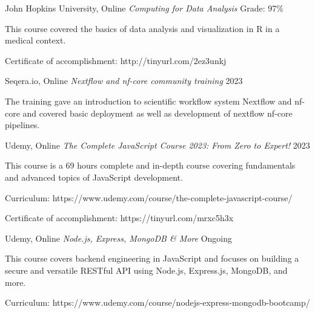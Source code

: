 \begin{cventries}
\cventry
  {John Hopkins University, Online} %
  {\textit{Computing for Data Analysis}} %
  {Grade: 97\%} %
  {} %
  {
    \begin{cvitems} %
      \item {This course covered the basics of data analysis and visualization in R in a medical context.}
      \item {Certificate of accomplishment: http://tinyurl.com/2ez3unkj}
    \end{cvitems}
  }
  \newline

  \cventry
  {Seqera.io, Online} %
  {\textit{Nextflow and nf-core community training}} %
  {2023} %
  {} %
  {
    \begin{cvitems} %
      \item {The training gave an introduction to scientific workflow system Nextflow and nf-core and covered basic deployment as well as development of nextflow nf-core pipelines.}
    \end{cvitems}
  }
  \newline


\cventry
  {Udemy, Online} %
  {\textit{The Complete JavaScript Course 2023: From Zero to Expert!}} %
  {2023} %
  {} %
  {
    \begin{cvitems} %
      \item {This course is a 69 hours complete and in-depth course covering fundamentals and advanced topics of JavaScript development.}
      \item {Curriculum: https://www.udemy.com/course/the-complete-javascript-course/}
      \item {Certificate of accomplishment: https://tinyurl.com/mrxc5h3x}
    \end{cvitems}
  }
  \newline

\cventry
  {Udemy, Online} %
  {\textit{Node.js, Express, MongoDB \& More}} %
  {Ongoing} %
  {} %
  {
    \begin{cvitems} %
      \item {This course covers backend engineering in JavaScript and focuses on building a secure and versatile RESTful API using Node.js, Express.js, MongoDB, and more.}
      \item {Curriculum: https://www.udemy.com/course/nodejs-express-mongodb-bootcamp/}
    \end{cvitems}
  }
  \newline


\end{cventries}
